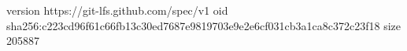 version https://git-lfs.github.com/spec/v1
oid sha256:c223cd96f61c66fb13c30ed7687e9819703e9e2e6cf031cb3a1ca8c372c23f18
size 205887
